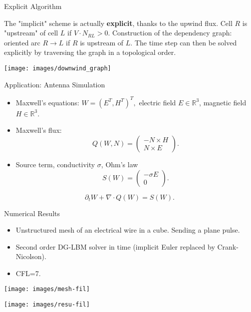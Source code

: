 \documentclass[english]{beamer}
\begin{document}
 \begin{frame}{Explicit Algorithm}

The "implicit" scheme is actually {\bf explicit}, thanks to the upwind flux. Cell $R$ is "upstream" of cell $L$ if $V\cdot N_{RL}>0$.
Construction of the dependency graph: oriented arc $R\rightarrow L$ if $R$ is upstream of $L$. The time step can then be solved explicitly by traversing the graph in a topological order.
\begin{center}
\texttt{[image: images/downwind\_graph]}
\par\end{center}

\end{frame}
%
\begin{frame}{Application: Antenna Simulation}
\begin{itemize}
\item Maxwell's equations: $W=(E^{T},H^{T})^{T},$ electric field $E\in\mathbb{R}^{3}$, magnetic field $H\in\mathbb{R}^{3}$.
\item Maxwell's flux: 
\[
Q(W,N)=\left(\begin{array}{c}
-N\times H\\
N\times E
\end{array}\right).
\]
\item Source term, conductivity $\sigma$, Ohm's law
\[
S(W)=\left(\begin{array}{c}
-\sigma E\\
0
\end{array}\right).
\]
\end{itemize}
\[
\partial_{t}W+\nabla\cdot Q(W)=S(W).
\]

\end{frame}
%
\begin{frame}{Numerical Results}
\begin{itemize}
\item Unstructured mesh of an electrical wire in a cube. Sending a plane pulse.
\item Second order DG-LBM solver in time (implicit Euler replaced by Crank-Nicolson).
\item CFL=7.
\end{itemize}
\begin{center}
\texttt{[image: images/mesh-fil]}
\par\end{center}

\begin{center}
\texttt{[image: images/resu-fil]}
\par\end{center}

\end{frame}
\end{document}
